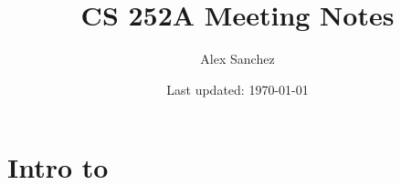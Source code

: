\documentclass[openany]{book}
\title{CS 252A Meeting Notes}
\author{Alex Sanchez}
\date{Last updated: \today}
\begin{document}
\maketitle
\tableofcontents

\chapter{Intro to}

\end{document}
